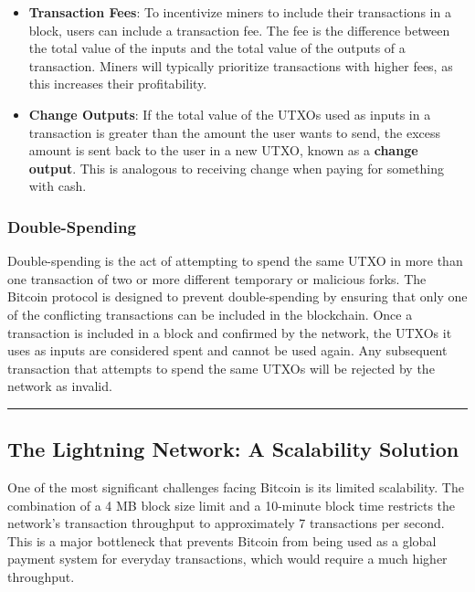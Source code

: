\begin{itemize}
	\tightlist
	\item
	\textbf{Transaction Fees}: To incentivize miners to include their
	transactions in a block, users can include a transaction fee. The fee
	is the difference between the total value of the inputs and the total
	value of the outputs of a transaction. Miners will typically
	prioritize transactions with higher fees, as this increases their
	profitability.
	\item
	\textbf{Change Outputs}: If the total value of the UTXOs used as
	inputs in a transaction is greater than the amount the user wants to
	send, the excess amount is sent back to the user in a new UTXO, known
	as a \textbf{change output}. This is analogous to receiving change
	when paying for something with cash.
\end{itemize}

\subsubsection{Double-Spending}\label{double-spending}
Double-spending is the act of attempting to spend the same UTXO in more
than one transaction of two or more different temporary or malicious forks. The Bitcoin protocol is designed to prevent
double-spending by ensuring that only one of the conflicting
transactions can be included in the blockchain. Once a transaction is
included in a block and confirmed by the network, the UTXOs it uses as
inputs are considered spent and cannot be used again. Any subsequent
transaction that attempts to spend the same UTXOs will be rejected by
the network as invalid.

\begin{center}\rule{0.5\linewidth}{0.5pt}\end{center}

\subsection{The Lightning Network: A Scalability
	Solution}\label{section-5-the-lightning-network-a-scalability-solution}

One of the most significant challenges facing Bitcoin is its limited
scalability. The combination of a 4 MB block size limit and a 10-minute block time restricts the network's
transaction throughput to approximately 7 transactions per second. This
is a major bottleneck that prevents Bitcoin from being used as a global
payment system for everyday transactions, which would require a much
higher throughput.

